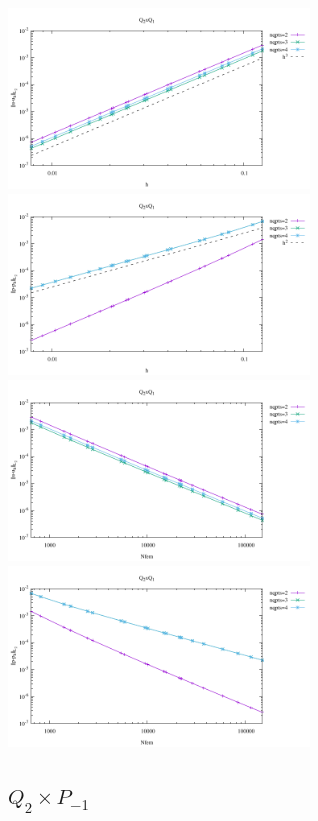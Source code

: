 \begin{center}
\includegraphics[width=8cm]{python_codes/fieldstone_120/results/Q2Q1-velocity-h.pdf}
\includegraphics[width=8cm]{python_codes/fieldstone_120/results/Q2Q1-pressure-h.pdf}\\
\includegraphics[width=8cm]{python_codes/fieldstone_120/results/Q2Q1-velocity-Nfem.pdf}
\includegraphics[width=8cm]{python_codes/fieldstone_120/results/Q2Q1-pressure-Nfem.pdf}
\end{center}

\newpage
\subsection*{$Q_2\times P_{-1}$}

